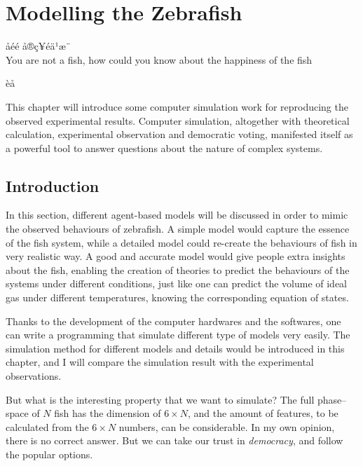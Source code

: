 \documentclass[11pt,twoside]{report}
\begin{document}
\chapter{Modelling the Zebrafish}
\label{chapter:fish_model}


\epigraph{å­éé­\; å®ç¥é­ä¹æ¨\\[1ex]You are not a fish, how could you know about the happiness of the fish}{èå­}

This chapter will introduce some computer simulation work for reproducing the observed experimental results. Computer simulation, altogether with theoretical calculation, experimental observation and democratic voting, manifested itself as a powerful tool to answer questions about the nature of complex systems.

\section{Introduction}

In this section, different agent-based models will be discussed in order to mimic the observed behaviours of zebrafish. A simple model would capture the essence of the fish system, while a detailed model could re-create the behaviours of fish in very realistic way. A good and accurate model would give people extra insights about the fish, enabling the creation of theories to predict the behaviours of the systems under different conditions, just like one can predict the volume of ideal gas under different temperatures, knowing the corresponding equation of states.

Thanks to the development of the computer hardwares and the softwares, one can write a programming that simulate different type of models very easily. The simulation method for different models and details would be introduced in this chapter, and I will compare the simulation result with the experimental observations.

But what is the interesting property that we want to simulate? The full phase--space of $N$ fish has the dimension of $6 \times N$, and the amount of features, to be calculated from the $6 \times N$ numbers, can be considerable. In my own opinion, there is no correct answer. But we can take our trust in \emph{democracy}, and follow the popular options.
\end{document}
